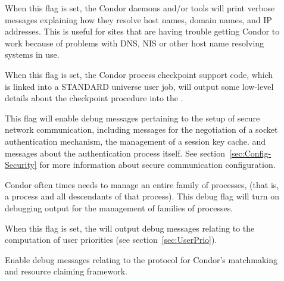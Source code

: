 \begin{description}
\begin{description}
  \item[] \label{dflag:hostname}
    When this flag is set, the Condor daemons and/or tools will print
    verbose messages explaining how they resolve host names, domain
    names, and IP addresses.
    This is useful for sites that are having trouble getting Condor to
    work because of problems with DNS, NIS or other host name resolving
    systems in use.

  \item[] \label{dflag:ckpt}
    When this flag is set,
    the Condor process checkpoint support code, which is linked into a STANDARD 
    universe user job, will output some low-level details about the checkpoint
    procedure into the .

  \item[] \label{dflag:security}
    This flag will enable debug messages pertaining to the setup of 
    secure network communication, 
    including messages for the negotiation of a socket 
    authentication mechanism, the management of a session key cache.
    and messages about the authentication process itself.  See
    section~\ref{sec:Config-Security} for more information about
    secure communication configuration.

  \item[] \label{dflag:procfamily}
    Condor often times needs to manage an entire family of processes, (that
    is, a 
    process and all descendants of that process).  This debug flag will 
    turn on debugging output for the management of families of processes.

  \item[] \label{dflag:accountant}
    When this flag is set,
    the  will output debug messages relating to the computation
    of user priorities (see section~\ref{sec:UserPrio}).

  \item[] \label{dflag:protocol}
    Enable debug messages relating to the protocol for Condor's matchmaking and
    resource claiming framework.
    

\end{description}
\end{description}
